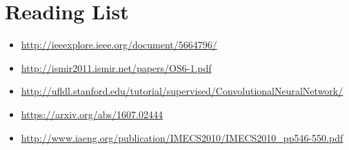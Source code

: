 \documentclass[11pt]{article}
\begin{document}
\section*{Reading List}
\begin{itemize}
    \item \href{http://ieeexplore.ieee.org/document/5664796/}{http://ieeexplore.ieee.org/document/5664796/}
    \item \href{http://ismir2011.ismir.net/papers/OS6-1.pdf}{http://ismir2011.ismir.net/papers/OS6-1.pdf}
    \item \href{http://ufldl.stanford.edu/tutorial/supervised/ConvolutionalNeuralNetwork/}{http://ufldl.stanford.edu/tutorial/supervised/ConvolutionalNeuralNetwork/}
    \item \href{https://arxiv.org/abs/1607.02444}{https://arxiv.org/abs/1607.02444}
    \item \href{http://www.iaeng.org/publication/IMECS2010/IMECS2010\_pp546-550.pdf}{http://www.iaeng.org/publication/IMECS2010/IMECS2010\_pp546-550.pdf}
\end{itemize}
\end{document}
